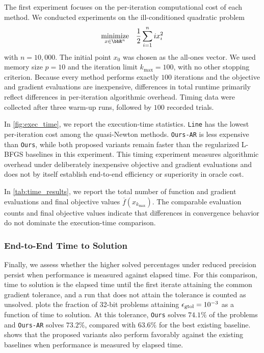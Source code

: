 \documentclass[journal_revised_MPC]{subfiles}
\begin{document}
The first experiment focuses on the per-iteration computational cost of each method.
We conducted experiments on the ill-conditioned quadratic problem
\begin{equation*}
    \underset{x \in \bbR^n}{\mathrm{minimize}} \quad \frac{1}{2} \sum_{i=1}^n i x_i^2
\end{equation*}
with $n=10{,}000$.
The initial point $x_0$ was chosen as the all-ones vector.
We used memory size $p=10$ and the iteration limit $k_{\max}=100$, with no other stopping criterion.
Because every method performs exactly $100$ iterations and the objective and gradient evaluations are inexpensive, differences in total runtime primarily reflect differences in per-iteration algorithmic overhead.
Timing data were collected after three warm-up runs, followed by $100$ recorded trials.

In \cref{fig:exec_time}, we report the execution-time statistics.
\texttt{Line} has the lowest per-iteration cost among the quasi-Newton methods.
\texttt{Ours-AR} is less expensive than \texttt{Ours}, while both proposed variants remain faster than the regularized L-BFGS baselines in this experiment.
This timing experiment measures algorithmic overhead under deliberately inexpensive objective and gradient evaluations and does not by itself establish end-to-end efficiency or superiority in oracle cost.

In \cref{tab:time_results}, we report the total number of function and gradient evaluations and final objective values $\overline{f}(x_{k_{\max}})$.
The comparable evaluation counts and final objective values indicate that differences in convergence behavior do not dominate the execution-time comparison.



\subsubsection{End-to-End Time to Solution}

\begin{MPCchange}
Finally, we assess whether the higher solved percentages under reduced precision persist when performance is measured against elapsed time.
For this comparison, time to solution is the elapsed time until the first iterate attaining the common gradient tolerance, and a run that does not attain the tolerance is counted as unsolved.
 plots the fraction of 32-bit problems attaining $\epsilon_{\mathrm{gtol}}=10^{-3}$ as a function of time to solution.
At this tolerance, \texttt{Ours} solves $74.1\%$ of the problems and \texttt{Ours-AR} solves $73.2\%$, compared with $63.6\%$ for the best existing baseline.
 shows that the proposed variants also perform favorably against the existing baselines when performance is measured by elapsed time.
\end{MPCchange}
\end{document}
